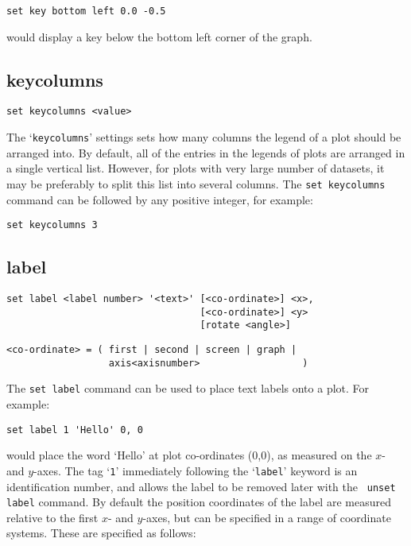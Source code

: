 \documentclass[a4paper,onecolumn,11pt]{book}
\begin{document}
\begin{verbatim}
set key bottom left 0.0 -0.5
\end{verbatim}

\noindent would display a key below the bottom left corner of the graph.


\subsection{keycolumns}

\begin{verbatim}
set keycolumns <value>
\end{verbatim}

The `{\tt keycolumns}' settings sets how many columns the legend of a plot should
be arranged into. By default, all of the entries in the legends of plots are
arranged in a single vertical list. However, for plots with very large number
of datasets, it may be preferably to split this list into several columns. The
{\tt set keycolumns} command can be followed by any positive integer, for
example:

\begin{verbatim}
set keycolumns 3
\end{verbatim}


\subsection{label}

\begin{verbatim}
set label <label number> '<text>' [<co-ordinate>] <x>,
                                  [<co-ordinate>] <y>
                                  [rotate <angle>]
\end{verbatim}

\begin{verbatim}
<co-ordinate> = ( first | second | screen | graph |
                  axis<axisnumber>                  )
\end{verbatim}

The {\tt set label} command can be used to place text labels onto a plot.  For
example:

\begin{verbatim}
set label 1 'Hello' 0, 0
\end{verbatim}

\noindent would place the word `Hello' at plot co-ordinates (0,0), as measured on the $x$-
and $y$-axes.  The tag `{\tt 1}' immediately following the `{\tt label}' keyword is an
identification number, and allows the label to be removed later with the {\tt
unset label} command.  By default the position coordinates of the label are
measured relative to the first $x$- and $y$-axes, but can be specified in a
range of coordinate systems. These are specified as follows:
\end{document}
